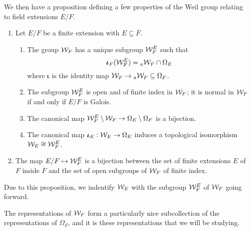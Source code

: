 We then have a proposition defining a few properties of the Weil group relating to field extensions $E/F$.
\begin{prop}
  \begin{enumerate}
    \item Let $E/F$ be a finite extension with $E \subseteq \overline{F}$.
    \begin{enumerate}
      \item The group $\mathcal{W}_F$ has a unique subgroup $\mathcal{W}^E_F$ such that \[\bm{\iota}_F(\mathcal{W}^E_F) = {}_a\mathcal{W}_F \cap \Omega_E\] where $\bm{\iota}$ is the identity map $\mathcal{W}_F \to {}_a\mathcal{W}_F \subseteq \Omega_F$.
      \item The subgroup $\mathcal{W}^E_F$ is open and of finite index in $\mathcal{W}_F$; it is normal in $\mathcal{W}_F$ if and only if $E/F$ is Galois.
      \item The canonical map $\mathcal{W}^E_F\setminus \mathcal{W}_F \to \Omega_E \setminus \Omega_F$ is a bijection.
      \item The canonical map $\bm{\iota}_E : \mathcal{W}_E \to \Omega_E$ induces a topological isomorphism $\mathcal{W}_E \cong \mathcal{W}^E_F$.
    \end{enumerate}
    \item The map $E/F \mapsto \mathcal{W}^E_F$ is a bijection between the set of finite extensions $E$ of $F$ inside $\overline{F}$ and the set of open subgroups of $\mathcal{W}_F$ of finite index.
  \end{enumerate}
\end{prop}

Due to this proposition, we indentify $\mathcal{W}_E$ with the subgroup $\mathcal{W}^E_F$ of $\mathcal{W}_F$ going forward.



The representations of $\mathcal{W}_F$ form a particularly nice subcollection of the representations of $\Omega_F$, and it is these representations that we will be studying.
